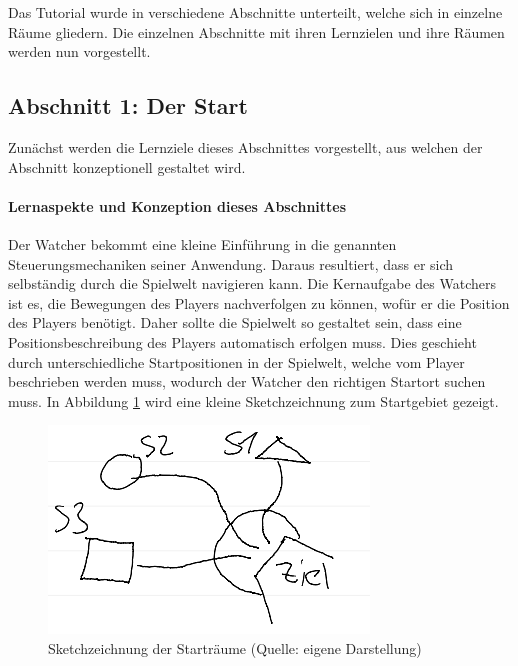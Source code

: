 Das Tutorial wurde in verschiedene Abschnitte unterteilt, welche sich in einzelne Räume gliedern. Die einzelnen Abschnitte mit ihren Lernzielen und ihre Räumen werden nun vorgestellt.
\subsection{Abschnitt 1: Der Start}
Zunächst werden die Lernziele dieses Abschnittes vorgestellt, aus welchen der Abschnitt konzeptionell gestaltet wird.

\paragraph{Lernaspekte und Konzeption dieses Abschnittes}
Der Watcher bekommt eine kleine Einführung in die genannten Steuerungsmechaniken seiner Anwendung. Daraus resultiert, dass er sich selbständig durch die Spielwelt navigieren kann. Die Kernaufgabe des Watchers ist es, die Bewegungen des Players nachverfolgen zu können, wofür er die Position des Players benötigt. Daher sollte die Spielwelt so gestaltet sein, dass eine Positionsbeschreibung des Players automatisch erfolgen muss. Dies geschieht durch unterschiedliche Startpositionen in der Spielwelt, welche vom Player beschrieben werden muss, wodurch der Watcher den richtigen Startort suchen muss. In Abbildung \ref{fig:sketch-starterrooms} wird eine kleine Sketchzeichnung zum Startgebiet gezeigt. 

\begin{figure}[ht]
\centering
\includegraphics[width=1\linewidth]{content/pictures/Startplaces_Sketch.png}
\caption{Sketchzeichnung der Starträume (Quelle: eigene Darstellung)}
\label{fig:sketch-starterrooms}
\end{figure}

